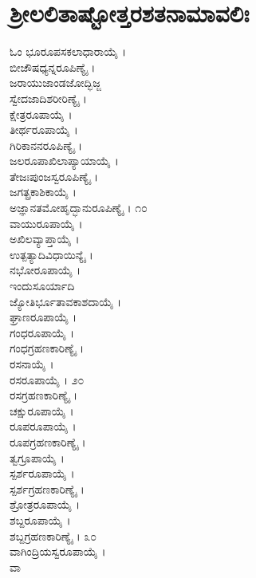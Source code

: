 \section{ಶ್ರೀಲಲಿತಾಷ್ಟೋತ್ತರಶತನಾಮಾವಲಿಃ}
\begin{multicols}{2}
ಓಂ ಭೂರೂಪಸಕಲಾಧಾರಾಯೈ ।\\ಬೀಜೌಷಧ್ಯನ್ನರೂಪಿಣ್ಯೈ ।\\ಜರಾಯುಜಾಂಡಜೋದ್ಭಿಜ್ಜ\\ಸ್ವೇದಜಾದಿಶರೀರಿಣ್ಯೈ ।\\ಕ್ಷೇತ್ರರೂಪಾಯೈ ।\\ತೀರ್ಥರೂಪಾಯೈ ।\\ಗಿರಿಕಾನನರೂಪಿಣ್ಯೈ ।\\ಜಲರೂಪಾಖಿಲಾಪ್ಯಾಯಾಯೈ ।\\ತೇಜಃಪುಂಜಸ್ವರೂಪಿಣ್ಯೈ ।\\ಜಗತ್ಪ್ರಕಾಶಿಕಾಯೈ ।\\ಅಜ್ಞಾನತಮೋಹೃದ್ಭಾನುರೂಪಿಣ್ಯೈ । ೧೦\\ವಾಯುರೂಪಾಯೈ ।\\ಅಖಿಲವ್ಯಾಪ್ತಾಯೈ ।\\ಉತ್ಪತ್ಯಾದಿವಿಧಾಯಿನ್ಯೈ ।\\ನಭೋರೂಪಾಯೈ ।\\ಇಂದುಸೂರ್ಯಾದಿ \\ಜ್ಯೋತಿರ್ಭೂತಾವಕಾಶದಾಯೈ ।\\ಘ್ರಾಣರೂಪಾಯೈ ।\\ಗಂಧರೂಪಾಯೈ ।\\ಗಂಧಗ್ರಹಣಕಾರಿಣ್ಯೈ ।\\ರಸನಾಯೈ ।\\ರಸರೂಪಾಯೈ । ೨೦\\ರಸಗ್ರಹಣಕಾರಿಣ್ಯೈ ।\\ಚಕ್ಷುರೂಪಾಯೈ ।\\ರೂಪರೂಪಾಯೈ ।\\ರೂಪಗ್ರಹಣಕಾರಿಣ್ಯೈ ।\\ತ್ವಗ್ರೂಪಾಯೈ ।\\ಸ್ಪರ್ಶರೂಪಾಯೈ ।\\ಸ್ಪರ್ಶಗ್ರಹಣಕಾರಿಣ್ಯೈ ।\\ಶ್ರೋತ್ರರೂಪಾಯೈ ।\\ಶಬ್ದರೂಪಾಯೈ ।\\ಶಬ್ದಗ್ರಹಣಕಾರಿಣ್ಯೈ । ೩೦\\ವಾಗಿಂದ್ರಿಯಸ್ವರೂಪಾಯೈ ।\\ವಾ
\end{multicols}
